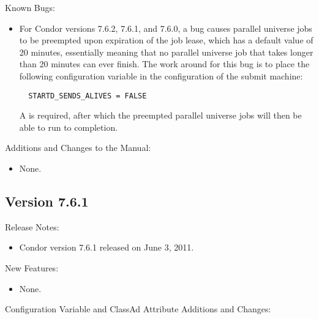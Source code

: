 \noindent Known Bugs:

\begin{itemize}

\item For Condor versions 7.6.2, 7.6.1, and 7.6.0,
a bug causes parallel universe jobs to be preempted upon 
expiration of the job lease, 
which has a default value of 20 minutes, 
essentially meaning that no parallel universe job that takes
longer than 20 minutes can ever finish.
The work around for this bug is to place the following
configuration variable in the configuration of the submit machine:
\begin{verbatim}
  STARTD_SENDS_ALIVES = FALSE
\end{verbatim}
A  is required, 
after which the preempted parallel universe jobs will then be
able to run to completion.

\end{itemize}

\noindent Additions and Changes to the Manual:

\begin{itemize}

\item None.

\end{itemize}


\subsection*{\label{sec:New-7-6-1}Version 7.6.1}

\noindent Release Notes:

\begin{itemize}

\item Condor version 7.6.1 released on June 3, 2011.

\end{itemize}


\noindent New Features:

\begin{itemize}

\item None.

\end{itemize}

\noindent Configuration Variable and ClassAd Attribute Additions and Changes:

